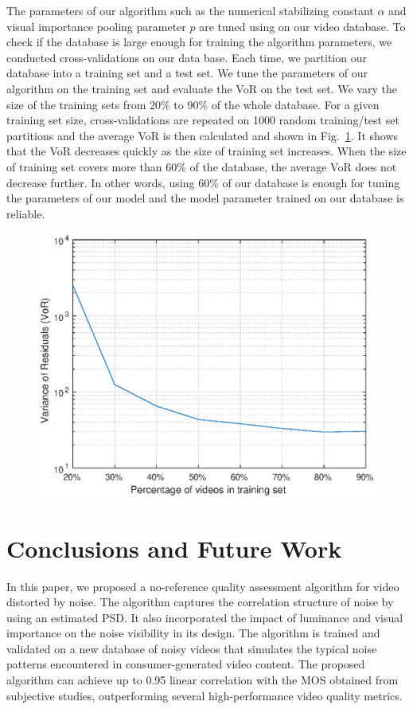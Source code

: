 \documentclass{sig-alternate}
\begin{document}
The parameters of our algorithm such as the numerical stabilizing constant $\alpha$ and visual importance pooling parameter $p$ are tuned using on our video database. To check if the database is large enough for training the algorithm parameters, we conducted cross-validations on our data base. Each time, we partition our database into a training set and a test set. We tune the parameters of our algorithm on the training set and evaluate the VoR on the test set. We vary the size of the training sets from 20\% to 90\% of the whole database. For a given training set size, cross-validations are repeated on 1000 random training/test set partitions and the average VoR is then calculated and shown in Fig.~\ref{fig:cross_validation}. It shows that the VoR decreases quickly as the size of training set increases. When the size of training set covers more than 60\% of the database, the average VoR does not decrease further. In other words, using 60\% of our database is enough for tuning the parameters of our model and the model parameter trained on our database is reliable. 
\begin{figure}
\label{fig:cross_validation}
\includegraphics[width=\columnwidth]{./img/cross_validation.eps}
\end{figure}

\section{Conclusions and Future Work}
\label{sec:conclusion}
In this paper, we proposed a no-reference quality assessment algorithm for video distorted by noise. The algorithm captures the correlation structure of noise by using an estimated PSD. It also incorporated the impact of luminance and visual importance on the noise visibility in its design. The algorithm is trained and validated on a new database of noisy videos that simulates the typical noise patterns encountered in consumer-generated video content. The proposed algorithm can achieve up to 0.95 linear correlation with the MOS obtained from subjective studies, outperforming several high-performance video quality metrics.
\end{document}
